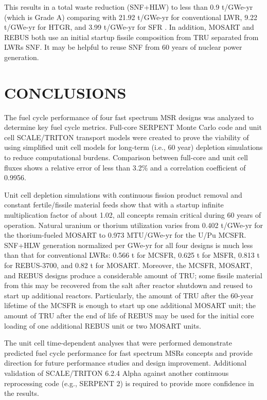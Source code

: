 \documentclass[letterpaper]{mandc2019}
\begin{document}
This results in a total waste reduction (\gls{SNF}+\gls{HLW}) to less than 0.9 t/GWe-yr (which is Grade A) comparing with 21.92 t/GWe-yr for conventional \gls{LWR}, 9.22 t/GWe-yr for \gls{HTGR}, and 3.99 t/GWe-yr for \gls{SFR} \cite{wigeland_nuclear_2014-4}.
In addition, \gls{MOSART} and REBUS both use an initial startup fissile composition from \gls{TRU} separated from \glspl{LWR} \gls{SNF}. It may be helpful to reuse \gls{SNF} from 60 years of nuclear power generation.
\section{CONCLUSIONS}
The fuel cycle performance of four fast spectrum \gls{MSR} designs was analyzed to determine key fuel cycle metrics. Full-core SERPENT Monte Carlo code and unit cell SCALE/TRITON transport models were created to prove the viability of using simplified unit cell models for long-term (i.e., 60 year) depletion simulations to reduce computational burdens. Comparison between full-core and unit cell fluxes shows a relative error of less than 3.2\% and a correlation coefficient of 0.9956.

Unit cell depletion simulations with continuous fission product removal and constant fertile/fissile material feeds show that with a startup infinite multiplication factor of about 1.02, all concepts remain critical during 60 years of operation. Natural uranium or thorium utilization varies from 0.402 t/GWe-yr for the thorium-fueled \gls{MOSART} to 0.973 MTU/GWe-yr for the U/Pu \gls{MCSFR}. \gls{SNF}+\gls{HLW} generation normalized per GWe-yr for all four designs is much less than that for conventional \glspl{LWR}: 0.566 t for \gls{MCSFR}, 0.625 t for \gls{MSFR}, 0.813 t for REBUS-3700, and 0.82 t for \gls{MOSART}. Moreover, the \gls{MCSFR}, \gls{MOSART}, and REBUS designs produce a considerable amount of \gls{TRU}; some fissile material from this may be recovered from the salt after reactor shutdown and reused to start up additional reactors. Particularly, the amount of \gls{TRU} after the 60-year lifetime of the \gls{MCSFR} is enough to start up one additional \gls{MOSART} unit; the amount of \gls{TRU} after the end of life of REBUS may be used for the initial core loading of one additional REBUS unit or two \gls{MOSART} units.

The unit cell time-dependent analyses that were performed demonstrate predicted fuel cycle performance for fast spectrum \glspl{MSR} concepts and provide direction for future performance studies and design improvement. Additional validation of SCALE/TRITON 6.2.4 Alpha against another continuous reprocessing code (e.g., SERPENT 2) is required to provide more confidence in the results.
\end{document}
